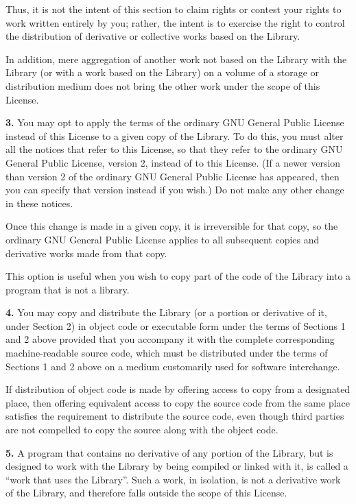 \documentclass[]{article}
\begin{document}
Thus, it is not the intent of this section to claim rights or contest
your rights to work written entirely by you; rather, the intent is to
exercise the right to control the distribution of derivative or
collective works based on the Library.

In addition, mere aggregation of another work not based on the Library
with the Library (or with a work based on the Library) on a volume of a
storage or distribution medium does not bring the other work under the
scope of this License.

\textbf{3.} You may opt to apply the terms of the ordinary GNU General
Public License instead of this License to a given copy of the Library.
To do this, you must alter all the notices that refer to this License,
so that they refer to the ordinary GNU General Public License, version
2, instead of to this License. (If a newer version than version 2 of the
ordinary GNU General Public License has appeared, then you can specify
that version instead if you wish.) Do not make any other change in these
notices.

Once this change is made in a given copy, it is irreversible for that
copy, so the ordinary GNU General Public License applies to all
subsequent copies and derivative works made from that copy.

This option is useful when you wish to copy part of the code of the
Library into a program that is not a library.

\textbf{4.} You may copy and distribute the Library (or a portion or
derivative of it, under Section 2) in object code or executable form
under the terms of Sections 1 and 2 above provided that you accompany it
with the complete corresponding machine-readable source code, which must
be distributed under the terms of Sections 1 and 2 above on a medium
customarily used for software interchange.

If distribution of object code is made by offering access to copy from a
designated place, then offering equivalent access to copy the source
code from the same place satisfies the requirement to distribute the
source code, even though third parties are not compelled to copy the
source along with the object code.

\textbf{5.} A program that contains no derivative of any portion of the
Library, but is designed to work with the Library by being compiled or
linked with it, is called a ``work that uses the Library''. Such a work,
in isolation, is not a derivative work of the Library, and therefore
falls outside the scope of this License.
\end{document}
